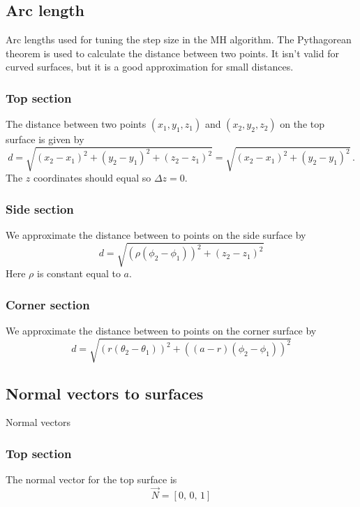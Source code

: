 \documentclass[a4paper,10pt]{article}
\numberwithin{equation}{section}
\begin{document}
\subsection{Arc length}
Arc lengths used for tuning the step size in the MH algorithm. The Pythagorean theorem is used to calculate the distance between two points.
It isn't valid for curved surfaces, but it is a good approximation for small distances.
\subsubsection{Top section}
The distance between two points \((x_1, y_1, z_1)\) and \((x_2, y_2, z_2)\) on the top surface is given by
\begin{equation}
  d = \sqrt{(x_2 - x_1)^2 + (y_2 - y_1)^2 + (z_2 - z_1)^2} = \sqrt{(x_2 - x_1)^2 + (y_2 - y_1)^2}\, .
\end{equation}
The \(z\) coordinates should equal so \(\Delta z = 0\).

\subsubsection{Side section}
We approximate the distance between to points on the side surface by
\begin{equation}
  d = \sqrt{\left( \rho(\phi_2 - \phi_1) \right)^2 + \left( z_2 - z_1\right)^2}
\end{equation}
Here \(\rho\) is constant equal to \(a\).

\subsubsection{Corner section}
We approximate the distance between to points on the corner surface by
\begin{equation}
  d = \sqrt{\left( r(\theta_2 - \theta_1) \right)^2 + \left( (a-r)(\phi_2 - \phi_1) \right)^2}
\end{equation}

%
\subsection{Normal vectors to surfaces}
Normal vectors
\subsubsection{Top section}
The normal vector for the top surface is
\begin{equation}
  \vec{N} = \left[0,\, 0,\, 1\right]
\end{equation}
\end{document}
